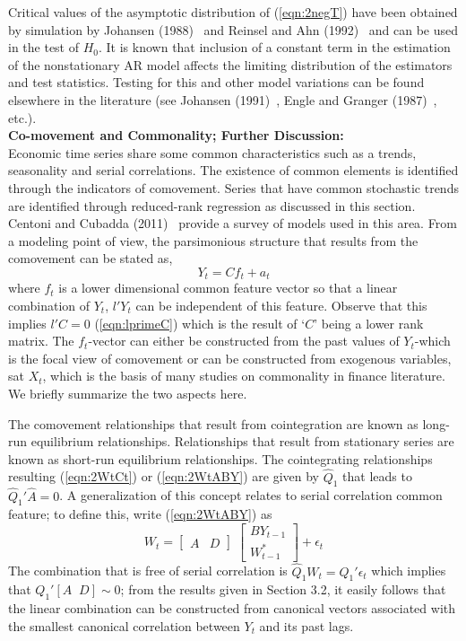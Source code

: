 Critical values of the asymptotic distribution of (\ref{eqn:2negT}) have been obtained by simulation by Johansen (1988)~\cite{johansen1988statistical} and Reinsel and Ahn (1992)~\cite{reinsel1992vector} and can be used in the test of $H_0$. It is known that inclusion of a constant term in the estimation of the nonstationary AR model affects the limiting distribution of the estimators and test statistics. Testing for this and other model variations can be found elsewhere in the literature (see Johansen (1991)~\cite{johansen1991estimation}, Engle and Granger (1987)~\cite{engle1987co}, etc.). \\


\noindent \textbf{Co-movement and Commonality; Further Discussion:} \\


Economic time series share some common characteristics such as a trends, seasonality and serial correlations. The existence of common elements is identified through the indicators of comovement. Series that have common stochastic trends are identified through reduced-rank regression as discussed in this section. Centoni and Cubadda (2011)~\cite{centoni} provide a survey of models used in this area. From a modeling point of view, the parsimonious structure that results from the comovement can be stated as,
	\begin{equation}\label{eqn:discyt}
	Y_t= Cf_t + a_t
	\end{equation}  
where $f_t$ is a lower dimensional common feature vector so that a linear combination of $Y_t$, $l' Y_t$ can be independent of this feature. Observe that this implies $l'C=0$ (\ref{eqn:lprimeC}) which is the result of `$C$' being a lower rank matrix. The $f_t$-vector can either be constructed from the past values of $Y_t$-which is the focal view of comovement or can be constructed from exogenous variables, sat $X_t$, which is the basis of many studies on commonality in finance literature. We briefly summarize the two aspects here. 


The comovement relationships that result from cointegration are known as long-run equilibrium relationships. Relationships that result from stationary series are known as short-run equilibrium relationships. The cointegrating relationships resulting (\ref{eqn:2WtCt}) or (\ref{eqn:2WtABY}) are given by $\hat{Q}_1$ that leads to $\hat{Q}_1' \hat{A}=0$. A generalization of this concept relates to serial correlation common feature; to define this, write (\ref{eqn:2WtABY}) as
	\begin{equation}\label{eqn:wtrewrite}
	W_t=  \begin{bmatrix} A & D \end{bmatrix} \; \begin{bmatrix} BY_{t-1} \\ W_{t-1}^* \end{bmatrix} + \epsilon_t
	\end{equation}
The combination that is free of serial correlation is $\hat{Q}_1W_t= Q_1' \epsilon_t$ which implies that $Q_1' [A \;\; D] \sim 0$; from the results given in Section 3.2, it easily follows that the linear combination can be constructed from canonical vectors associated with the smallest canonical correlation between $Y_t$ and its past lags.


